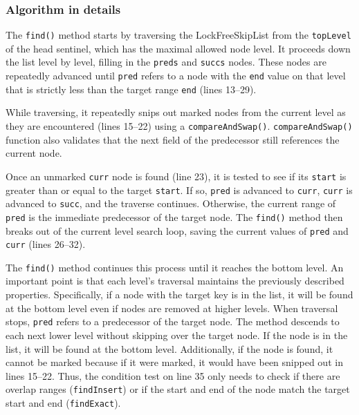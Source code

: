 \vspace{15pt}
\begin{figure}[h]
    \centering
    
\end{figure}

\subsubsection{Algorithm in details}
The \texttt{find()} method starts by traversing the LockFreeSkipList from the \texttt{topLevel} of the head sentinel, which has the maximal allowed node level.
It proceeds down the list level by level, filling in the \texttt{preds} and \texttt{succs} nodes.
These nodes are repeatedly advanced until \texttt{pred} refers to a node with the \texttt{end} value on that level that is strictly less than the target range \texttt{end} (lines 13--29).

While traversing, it repeatedly snips out marked nodes from the current level as they are encountered (lines 15--22) using a \texttt{compareAndSwap()}.
\texttt{compareAndSwap()} function also validates that the next field of the predecessor still references the current node.

Once an unmarked \texttt{curr} node is found (line 23), it is tested to see if its \texttt{start} is greater than or equal to the target \texttt{start}.
If so, \texttt{pred} is advanced to \texttt{curr}, \texttt{curr} is advanced to \texttt{succ}, and the traverse continues.
Otherwise, the current range of \texttt{pred} is the immediate predecessor of the target node.
The \texttt{find()} method then breaks out of the current level search loop, saving the current values of \texttt{pred} and \texttt{curr} (lines 26--32).

The \texttt{find()} method continues this process until it reaches the bottom level.
An important point is that each level's traversal maintains the previously described properties.
Specifically, if a node with the target key is in the list, it will be found at the bottom level even if nodes are removed at higher levels.
When traversal stops, \texttt{pred} refers to a predecessor of the target node.
The method descends to each next lower level without skipping over the target node.
If the node is in the list, it will be found at the bottom level.
Additionally, if the node is found, it cannot be marked because if it were marked, it would have been snipped out in lines 15--22.
Thus, the condition test on line 35 only needs to check if there are overlap ranges (\texttt{findInsert}) or if the start and end of the node match the target start and end (\texttt{findExact}).

